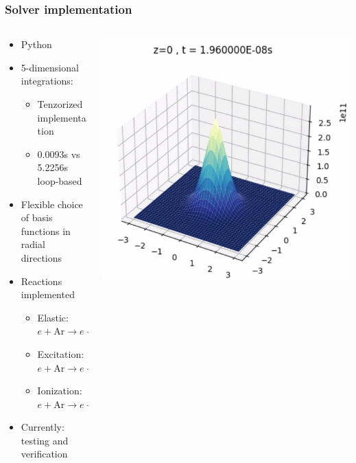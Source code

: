 \documentclass[mathserif, aspectratio=169]{beamer}
\begin{document}
\begin{frame}
\frametitle{Solver implementation}
%
\begin{columns}[T]
\begin{column}{0.6\linewidth}
\begin{itemize}
\item Python 
\item 5-dimensional integrations: 
\begin{itemize}
\item Tenzorized implementation
\item 0.0093s vs 5.2256s loop-based
\end{itemize}
\item Flexible choice of basis functions in radial directions
\item Reactions implemented
\begin{itemize}
\item Elastic: $e + \text{Ar} \rightarrow e + \text{Ar}$
\item Excitation: $e + \text{Ar} \rightarrow e + \text{Ar}^*$
\item Ionization: $e + \text{Ar} \rightarrow e + \text{Ar}^+ + e$
\end{itemize}
\item Currently: testing and verification
\end{itemize}
\end{column}
\begin{column}{0.4\linewidth}
  \vspace{-0.35in}
  \begin{center}
   \includegraphics[width=\textwidth]{figures/code.png}
  \end{center}
\end{column}
\end{columns}
%
\end{frame}


\end{document}
